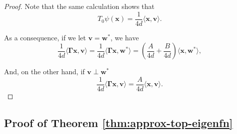 \begin{proof}
    Note that the same calculation shows that
    \[
        T_0 \psi(\bm x) = \frac{1}{4d}\langle \bm x, \bm v\rangle.
    \]
    
    As a consequence, if we let $\bm v = \bm w^*$, we have
    \[
        \frac{1}{4d}\langle \bm \Gamma \bm x, \bm v\rangle = \frac{1}{4d}\langle \bm \Gamma \bm x, \bm w^*\rangle = \left(\frac{A}{4d} + \frac{B}{4d}\right)\langle\bm x, \bm w^*\rangle,
    \]
        
    And, on the other hand, if $\bm v \perp \bm w^*$
    \[
        \frac{1}{4d}\langle \bm \Gamma \bm x, \bm v\rangle = \frac{A}{4d}\langle\bm x, \bm v\rangle.        
    \]

\end{proof}

\subsection{Proof of Theorem \ref{thm:approx-top-eigenfn}}\label{app:thm-approx-top-eigenfn}
